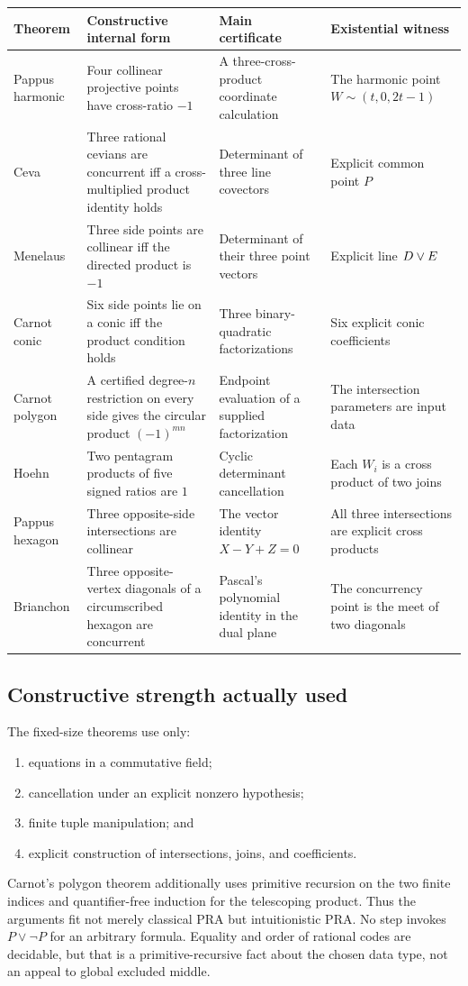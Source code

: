 \begin{longtable}{p{}p{}p{}p{}}
\toprule
Theorem & Constructive internal form & Main certificate & Existential witness \\
\midrule
\endhead
Pappus harmonic & Four collinear projective points have cross-ratio $-1$ & A three-cross-product coordinate calculation & The harmonic point $W\sim(t,0,2t-1)$ \\
Ceva & Three rational cevians are concurrent iff a cross-multiplied product identity holds & Determinant of three line covectors & Explicit common point $P$ \\
Menelaus & Three side points are collinear iff the directed product is $-1$ & Determinant of their three point vectors & Explicit line $D\mathbin{\vee} E$ \\
Carnot conic & Six side points lie on a conic iff the product condition holds & Three binary-quadratic factorizations & Six explicit conic coefficients \\
Carnot polygon & A certified degree-$n$ restriction on every side gives the circular product $(-1)^{mn}$ & Endpoint evaluation of a supplied factorization & The intersection parameters are input data \\
Hoehn & Two pentagram products of five signed ratios are $1$ & Cyclic determinant cancellation & Each $W_i$ is a cross product of two joins \\
Pappus hexagon & Three opposite-side intersections are collinear & The vector identity $X-Y+Z=0$ & All three intersections are explicit cross products \\
Brianchon & Three opposite-vertex diagonals of a circumscribed hexagon are concurrent & Pascal's polynomial identity in the dual plane & The concurrency point is the meet of two diagonals \\
\bottomrule
\end{longtable}

\subsection{Constructive strength actually used}

The fixed-size theorems use only:
\begin{enumerate}
\item equations in a commutative field;
\item cancellation under an explicit nonzero hypothesis;
\item finite tuple manipulation; and
\item explicit construction of intersections, joins, and coefficients.
\end{enumerate}
Carnot's polygon theorem additionally uses primitive recursion on the two finite indices and quantifier-free induction for the telescoping product.  Thus the arguments fit not merely classical PRA but intuitionistic PRA.  No step invokes $P\lor\neg P$ for an arbitrary formula.  Equality and order of rational codes are decidable, but that is a primitive-recursive fact about the chosen data type, not an appeal to global excluded middle.

